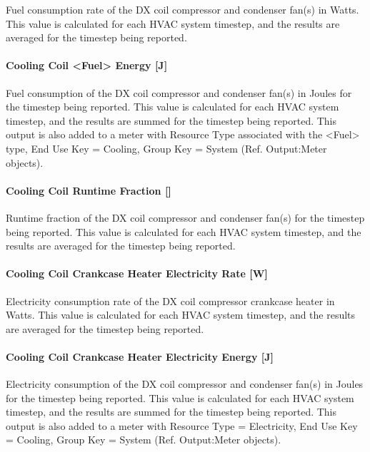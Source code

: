 Fuel consumption rate of the DX coil compressor and condenser fan(s) in Watts. This value is calculated for each HVAC system timestep, and the results are averaged for the timestep being reported.

\paragraph{Cooling Coil <Fuel> Energy {[}J{]}}

Fuel consumption of the DX coil compressor and condenser fan(s) in Joules for the timestep being reported. This value is calculated for each HVAC system timestep, and the results are summed for the timestep being reported. This output is also added to a meter with Resource Type associated with the <Fuel> type, End Use Key = Cooling, Group Key = System (Ref. Output:Meter objects).

\paragraph{Cooling Coil Runtime Fraction {[]}}

Runtime fraction of the DX coil compressor and condenser fan(s) for the timestep being reported. This value is calculated for each HVAC system timestep, and the results are averaged for the timestep being reported.

\paragraph{Cooling Coil Crankcase Heater Electricity Rate {[}W{]}}

Electricity consumption rate of the DX coil compressor crankcase heater in Watts. This value is calculated for each HVAC system timestep, and the results are averaged for the timestep being reported.

\paragraph{Cooling Coil Crankcase Heater Electricity Energy {[}J{]}}

Electricity consumption of the DX coil compressor and condenser fan(s) in Joules for the timestep being reported. This value is calculated for each HVAC system timestep, and the results are summed for the timestep being reported. This output is also added to a meter with Resource Type = Electricity, End Use Key = Cooling, Group Key = System (Ref. Output:Meter objects).

